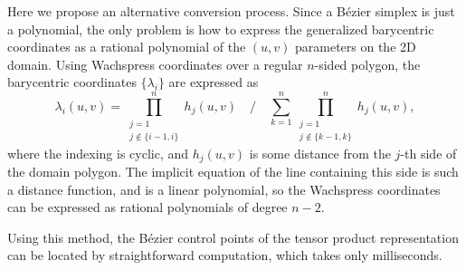 \documentclass{article}
\begin{document}
Here we propose an alternative conversion process. Since a B\'ezier simplex is just a polynomial,
the only problem is how to express the generalized barycentric coordinates as a rational polynomial
of the $(u,v)$ parameters on the 2D domain. Using Wachspress coordinates over a regular $n$-sided
polygon, the barycentric coordinates $\{\lambda_i\}$ are expressed as
\begin{equation}
  \label{eq:wachspress}
  \lambda_i(u,v) = \prod_{\substack{j=1\\j\notin\{i-1,i\}}}^nh_j(u,v) \quad\bigg/\quad
                   \sum_{k=1}^n\prod_{\substack{j=1\\j\notin\{k-1,k\}}}^nh_j(u,v),
\end{equation}
where the indexing is cyclic, and $h_j(u,v)$ is some distance
from the $j$-th side of the domain polygon. The implicit
equation of the line containing this side is such a distance function, and is a linear polynomial,
so the Wachspress coordinates can be expressed as rational polynomials of degree $n-2$.

Using this method, the B\'ezier control points of the tensor product representation
can be located by straightforward computation, which takes only milliseconds.
\end{document}
